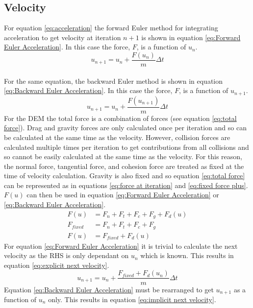 \documentclass[10pt,a4paper,titlepage]{report}
\begin{document}
\subsection{Velocity}
For equation \ref{eq:acceleration} the forward Euler method for integrating acceleration to get velocity at iteration $n + 1$ is shown in equation \ref{eq:Forward Euler Acceleration}. In this case the force, $F$, is a function of $u_n$.
\begin{equation}
u_{n+1} = u_{n} + \dfrac{F(u_n)}{m}\Delta t
\label{eq:Forward Euler Acceleration}
\end{equation}
\\For the same equation, the backward Euler method is shown in equation \ref{eq:Backward Euler Acceleration}. In this case the force, $F$, is a function of $u_{n+1}$.
\begin{equation}
u_{n+1} = u_{n} + \dfrac{F(u_{n+1})}{m}\Delta t
\label{eq:Backward Euler Acceleration}
\end{equation}
For the DEM the total force is a combination of forces (see equation \ref{eq:total force}). Drag and gravity forces are only calculated once per iteration and so can be calculated at the same time as the velocity. However, collision forces are calculated multiple times per iteration to get contributions from all collisions and so cannot be easily calculated at the same time as the velocity. For this reason, the normal force, tangential force, and cohesion force are treated as fixed at the time of velocity calculation. Gravity is also fixed and so equation \ref{eq:total force} can be represented as in equations \ref{eq:force at iteration} and \ref{eq:fixed force plus}. $F(u)$ can then be used in equation \ref{eq:Forward Euler Acceleration} or \ref{eq:Backward Euler Acceleration}.
\begin{align}
F(u) &= F_n + F_t + F_c + F_g + F_d(u)
\label{eq:force at iteration} \\
F_{fixed} &= F_n + F_t + F_c + F_g \\
F(u) &= F_{fixed} + F_d(u) \label{eq:fixed force plus}
\end{align}
For equation \ref{eq:Forward Euler Acceleration} it is trivial to calculate the next velocity as the RHS is only dependant on $u_n$ which is known. This results in equation \ref{eq:explicit next velocity}.
\begin{equation}
u_{n+1} = u_n + \dfrac{F_{fixed} + F_d(u_n)}{m} \Delta t \label{eq:explicit next velocity}
\end{equation}
Equation \ref{eq:Backward Euler Acceleration} must be rearranged to get $u_{n+1}$ as a function of $u_{n}$ only. This results in equation \ref{eq:implicit next velocity}.
\end{document}
